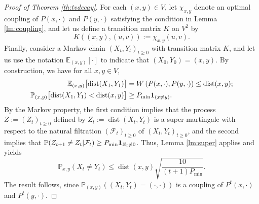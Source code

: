 \documentclass[JEP,XML,SOM,Unicode,NoEqCountersInSection,published]{cedram}
\theoremstyle{definition}
\newcommand{\EE}{{\mathbb{E}}}
\newcommand{\PP}{{\mathbb{P}}}
\newcommand{\cF}{\mathcal {F}}
\newcommand{\pmin}{P_{\mathrm{min}}}
\DeclareMathOperator{\dist}{dist}
\begin{document}
\begin{proof}[Proof of Theorem \ref{th:tvdecay}]For each $(x,y)\in V$, let $\chi_{x,y}$ denote an optimal coupling of $P(x,\cdot)$ and $P(y,\cdot)$ satisfying the condition in Lemma \ref{lm:coupling}, and let us define a transition matrix $K$ on $V^2$ by
\begin{equation*}
K((x,y),(u,v)) := \chi_{x,y}(u,v).
\end{equation*}
Finally, consider a Markov chain $(X_t,Y_t)_{t\ge 0}$ with transition matrix $K$, and let us use the notation $\EE_{(x,y)}[\cdot]$ to indicate that $(X_0,Y_0)=(x,y)$. By construction, we have for all $x,y\in V$,
\begin{align*}
\EE_{(x,y)} \bigl[\dist(X_{1},Y_{1}) \bigr] & = W\left(P(x,\cdot),P(y,\cdot)\right)\le \dist(x,y);\\
\PP_{(x,y)}\bigl[\dist(X_1,Y_1)<\dist(x,y)\bigr] & \ge \pmin{\bf 1}_{(x\ne y)}.
\end{align*}
By the Markov property, the first condition implies that the process $Z:=(Z_t)_{t\ge 0}$ defined by
$
Z_t := \dist(X_t,Y_t)
$
is a super-martingale with respect to the natural filtration $(\cF_t)_{t\ge 0}$ of $(X_t,Y_t)_{t\ge 0}$, and the second implies that $\PP(Z_{t+1}\ne Z_t|\cF_t)\ge\pmin{\bf 1}_{Z_t\ne 0}$. Thus, Lemma \ref{lm:super} applies and yields
\begin{equation*}
\PP_{x,y}(X_t\ne Y_t) \le \dist(x,y)\sqrt{\frac{10}{ (t+1)\pmin}}.
\end{equation*}
The result follows, since $\PP_{(x,y)}\left((X_t,Y_t)=(\cdot,\cdot)\right)$ is a coupling of $P^t(x,\cdot)$ and $P^t(y,\cdot)$.
\end{proof}

\backmatter


\end{document}
